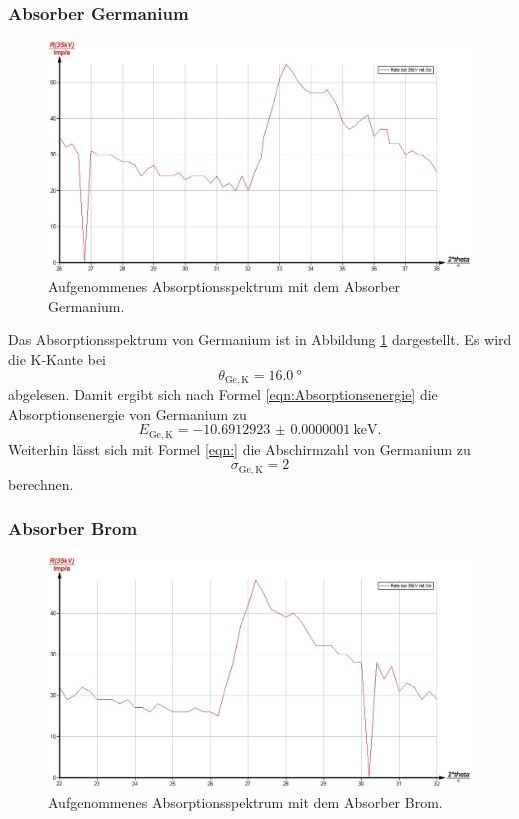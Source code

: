\FloatBarrier
\subsubsection{Absorber Germanium}
\begin{figure}
	\includegraphics[width=1.0\textwidth]{nIKO_und_jULIAN_ÜLADS/germanium.jpg}
	\caption{Aufgenommenes Absorptionsspektrum mit dem Absorber Germanium.}
	\label{fig:germanium_absorber}
\end{figure}
Das Absorptionsspektrum von Germanium ist in Abbildung \ref{fig:germanium_absorber}
dargestellt. Es wird die K-Kante bei
\begin{equation*}
	\theta_{\mathrm{Ge,K}} = \SI{16,0}{\degree}
\end{equation*}
abgelesen. Damit ergibt sich nach Formel \eqref{eqn:Absorptionsenergie} die Absorptionsenergie
von Germanium zu
\begin{equation*}
	E_{\mathrm{Ge,K}} = -\SI{10.6912923(1)}{\kilo\electronvolt} \mathrm{.}
\end{equation*}
Weiterhin lässt sich mit Formel \eqref{eqn:} die Abschirmzahl von Germanium zu
\begin{equation*}
	\sigma_{\mathrm{Ge,K}} = 2
\end{equation*}
berechnen.

\FloatBarrier
\subsubsection{Absorber Brom}
\begin{figure}
	\includegraphics[width=1.0\textwidth]{nIKO_und_jULIAN_ÜLADS/brom.jpg}
	\caption{Aufgenommenes Absorptionsspektrum mit dem Absorber Brom.}
	\label{fig:brom_absorber}
\end{figure}

